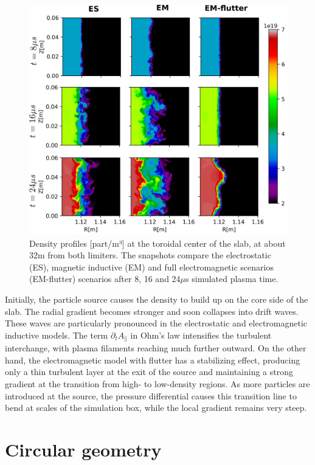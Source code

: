 \begin{figure}[H]\centering
	\centering
	\includegraphics[width=.95\textwidth]{schemes/slab_source.png}
	\caption{Density profiles [part/m³] at the toroidal center of the slab, at about 32m from both limiters. The snapshots compare the electrostatic (ES), magnetic inductive (EM) and full electromagnetic scenarios (EM-flutter) scenarios after 8, 16 and 24$\mu$s simulated plasma time.}
	\label{fig:SLABturb}
\end{figure}

Initially, the particle source causes the density to build up on the core side of the slab. The radial gradient becomes stronger and soon collapses into drift waves. These waves are particularly pronounced in the electrostatic and electromagnetic inductive models. The term $\partial_t A_\parallel$ in Ohm's law intensifies the turbulent interchange, with plasma filaments reaching much further outward. On the other hand, the electromagnetic model with flutter has a stabilizing effect, producing only a thin turbulent layer at the exit of the source and maintaining a strong gradient at the transition from high- to low-density regions. As more particles are introduced at the source, the pressure differential causes this transition line to bend at scales of the simulation box, while the local gradient remains very steep. \newline




\section{Circular geometry}
\label{sec:anal_CIRC}

